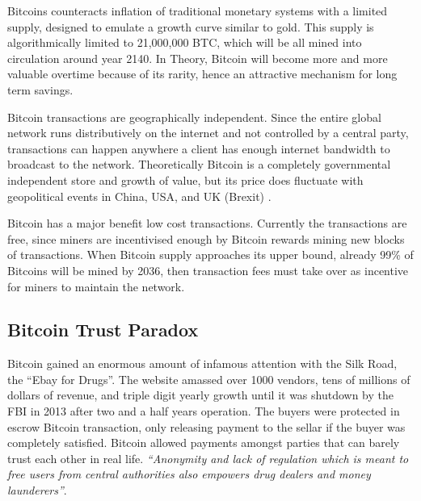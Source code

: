 \documentclass[12pt]{article} %
\begin{document}
Bitcoins counteracts inflation of traditional monetary systems with a limited supply, designed to emulate a growth curve similar to gold. This supply is algorithmically limited to 21,000,000 BTC, which will be all mined into circulation around year 2140. In Theory, Bitcoin will become more and more valuable overtime because of its rarity, hence an attractive mechanism for long term savings.

Bitcoin transactions are geographically independent. Since the entire global network runs distributively on the internet and not controlled by a central party, transactions can happen anywhere a client has enough internet bandwidth to broadcast to the network. Theoretically  Bitcoin is a completely governmental independent store and growth of value, but its price does fluctuate with geopolitical events in China, USA, and UK (Brexit) .

Bitcoin has a major benefit low cost transactions. Currently the transactions are free, since miners are incentivised enough by Bitcoin rewards mining new blocks of transactions. When Bitcoin supply approaches its upper bound, already 99\% of Bitcoins will be mined by 2036, then transaction fees must take over as incentive for miners to maintain the network.   

\subsection{Bitcoin Trust Paradox}
Bitcoin gained an enormous amount of infamous attention with the Silk Road, the ``Ebay for Drugs''\cite{EbayForDrugs}. The website amassed over 1000 vendors, tens of millions of dollars of revenue, and triple digit yearly growth until it was shutdown by the FBI in 2013 after two and a half years operation\cite{NotAnEbayForDrugs}. The buyers were protected in escrow Bitcoin transaction, only releasing payment to the sellar if the buyer was completely satisfied. Bitcoin allowed payments amongst parties that can barely trust each other in real life. \textit{``Anonymity and lack of regulation which is meant to free users from central authorities also empowers drug dealers and money launderers''}\cite{Ali:2015:BPU:2990603.2990632}.
\end{document}
